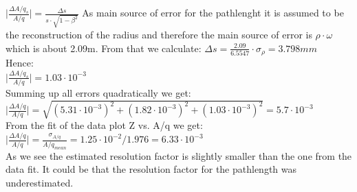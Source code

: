 \documentclass[12pt, letterpaper]{article}
\begin{document}
$\big|\frac{\Delta A/q_{s}}{A/q}\big| = \frac{\Delta s}{s\cdot \sqrt{1- \beta^{2}}}$
As main source of error for the pathlenght it is assumed to be the reconstruction of the radius and therefore the main source of error is $\rho \cdot \omega$ which is about 2.09m. From that we calculate: 
$\Delta s = \frac{2.09}{6.5547}\cdot \sigma_{\rho} = 3.798mm $ \\
Hence:\\
$\big|\frac{\Delta A/q_{s}}{A/q}\big| = 1.03 \cdot 10^{-3}$\\
\newline
Summing up all errors quadratically we get:\\
$\Big|\frac{\Delta A/q}{A/q}\Big| = \sqrt{ (5.31\cdot 10^{-3})^{2} + (1.82 \cdot 10^{-3})^{2} + (1.03 \cdot 10^{-3})^{2}} = 5.7 \cdot 10^{-3}$ \\ 
\newline
From the fit of the data plot Z vs. A/q we get:\\
$\Big|\frac{\Delta A/q}{A/q}\Big| = \frac{\sigma_{A/q}}{A/q_{mean}} = 1.25 \cdot 10^{-2}/1.976 = 6.33 \cdot 10^{-3}$\\
\newline
As we see the estimated resolution factor is slightly smaller than the one from the data fit. It could be that the resolution factor for the pathlength was underestimated.\\


 
\end{document}
